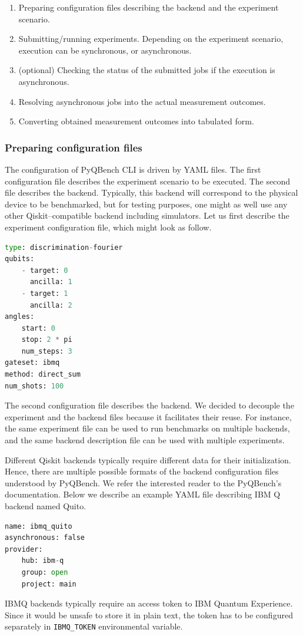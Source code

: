 \documentclass[preprint,12pt, a4paper, dvipsnames]{elsarticle}
\newcommand{\1}{{\rm 1\hspace{-0.9mm}l}}
\theoremstyle{definition}
\begin{document}
\begin{enumerate}
  \item Preparing configuration files describing the backend and the experiment scenario.
  \item Submitting/running experiments. Depending on the experiment scenario, execution can be
		synchronous, or asynchronous.
  \item (optional) Checking the status of the submitted jobs if the execution is asynchronous.
  \item Resolving asynchronous jobs into the actual measurement outcomes.
  \item Converting obtained measurement outcomes into tabulated form.
\end{enumerate}
\subsubsection{Preparing configuration files}
The configuration of PyQBench CLI is driven by YAML files. The first configuration file describes
the experiment scenario to be executed. The second file describes the backend. Typically, this
backend will correspond to the physical device to be benchmarked, but for testing purposes, one
might as well use any other Qiskit--compatible backend including simulators. Let us first describe
the experiment configuration file, which might look as follow.
\begin{lstlisting}[language=Python, caption=Defining the experiment, label=lst:experiment]
type: discrimination-fourier
qubits:
	- target: 0
	  ancilla: 1
	- target: 1
      ancilla: 2
angles:
	start: 0
	stop: 2 * pi
	num_steps: 3
gateset: ibmq
method: direct_sum
num_shots: 100
\end{lstlisting}

The second configuration file describes the backend. We decided to decouple the experiment and the
backend files because it facilitates their reuse. For instance, the same experiment file can be used
to run benchmarks on multiple backends, and the same backend description file can be used with
multiple experiments.

Different Qiskit backends typically require different data for their initialization. Hence, there
are multiple possible formats of the backend configuration files understood by PyQBench. We refer
the interested reader to the PyQBench's documentation. Below we describe an example YAML file
describing IBM Q backend named Quito.
\begin{lstlisting}[language=Python, caption=IBMQ backend, label=lst:backend]
name: ibmq_quito
asynchronous: false
provider:
	hub: ibm-q
	group: open
	project: main
\end{lstlisting}
IBMQ backends typically require an access token to IBM Quantum Experience. Since it would be unsafe
to store it in plain text, the token has to be configured separately in \texttt{IBMQ\_TOKEN}
environmental variable.
\end{document}
